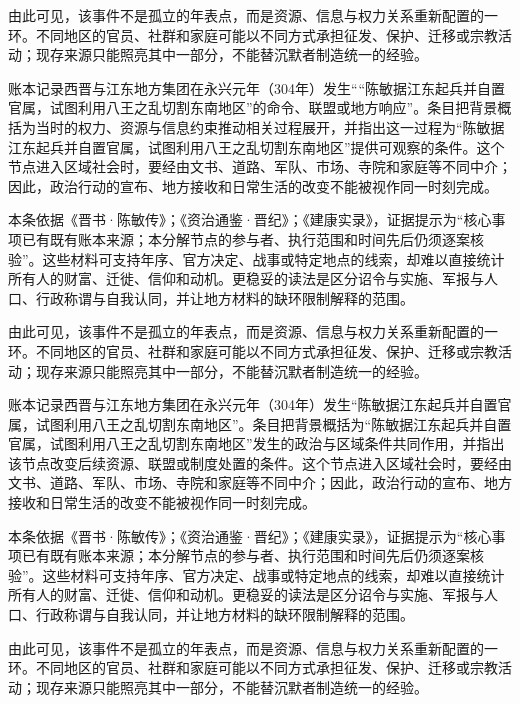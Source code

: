 由此可见，该事件不是孤立的年表点，而是资源、信息与权力关系重新配置的一环。不同地区的官员、社群和家庭可能以不同方式承担征发、保护、迁移或宗教活动；现存来源只能照亮其中一部分，不能替沉默者制造统一的经验。

账本记录西晋与江东地方集团在永兴元年（304年）发生““陈敏据江东起兵并自置官属，试图利用八王之乱切割东南地区”的命令、联盟或地方响应”。条目把背景概括为当时的权力、资源与信息约束推动相关过程展开，并指出这一过程为“陈敏据江东起兵并自置官属，试图利用八王之乱切割东南地区”提供可观察的条件。这个节点进入区域社会时，要经由文书、道路、军队、市场、寺院和家庭等不同中介；因此，政治行动的宣布、地方接收和日常生活的改变不能被视作同一时刻完成。

本条依据《晋书·陈敏传》；《资治通鉴·晋纪》；《建康实录》，证据提示为“核心事项已有既有账本来源；本分解节点的参与者、执行范围和时间先后仍须逐案核验”。这些材料可支持年序、官方决定、战事或特定地点的线索，却难以直接统计所有人的财富、迁徙、信仰和动机。更稳妥的读法是区分诏令与实施、军报与人口、行政称谓与自我认同，并让地方材料的缺环限制解释的范围。

由此可见，该事件不是孤立的年表点，而是资源、信息与权力关系重新配置的一环。不同地区的官员、社群和家庭可能以不同方式承担征发、保护、迁移或宗教活动；现存来源只能照亮其中一部分，不能替沉默者制造统一的经验。

账本记录西晋与江东地方集团在永兴元年（304年）发生“陈敏据江东起兵并自置官属，试图利用八王之乱切割东南地区”。条目把背景概括为“陈敏据江东起兵并自置官属，试图利用八王之乱切割东南地区”发生的政治与区域条件共同作用，并指出该节点改变后续资源、联盟或制度处置的条件。这个节点进入区域社会时，要经由文书、道路、军队、市场、寺院和家庭等不同中介；因此，政治行动的宣布、地方接收和日常生活的改变不能被视作同一时刻完成。

本条依据《晋书·陈敏传》；《资治通鉴·晋纪》；《建康实录》，证据提示为“核心事项已有既有账本来源；本分解节点的参与者、执行范围和时间先后仍须逐案核验”。这些材料可支持年序、官方决定、战事或特定地点的线索，却难以直接统计所有人的财富、迁徙、信仰和动机。更稳妥的读法是区分诏令与实施、军报与人口、行政称谓与自我认同，并让地方材料的缺环限制解释的范围。

由此可见，该事件不是孤立的年表点，而是资源、信息与权力关系重新配置的一环。不同地区的官员、社群和家庭可能以不同方式承担征发、保护、迁移或宗教活动；现存来源只能照亮其中一部分，不能替沉默者制造统一的经验。

